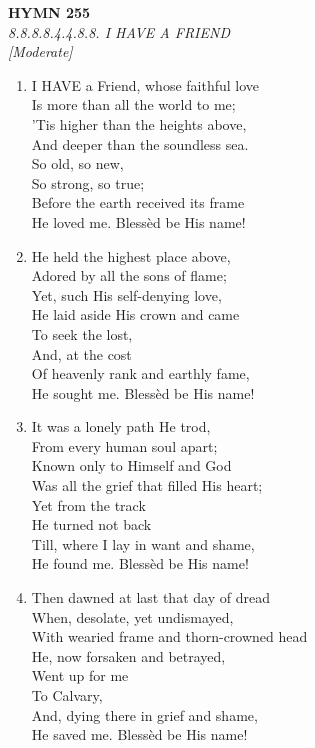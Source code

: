 \newpage
\begin{center}
    {\Large \textbf{HYMN 255}}
    \\
    \textit{8.8.8.8.4.4.8.8. I HAVE A FRIEND}
    \\
    \textit{\small [Moderate]}
\end{center}
\vspace{1em}

\begin{enumerate}
    \item I HAVE a Friend, whose faithful love \\
        Is more than all the world to me; \\
        'Tis higher than the heights above, \\
        And deeper than the soundless sea. \\
            So old, so new, \\
            So strong, so true; \\
        Before the earth received its frame \\
        He loved me. Bless\`ed be His name!

    \item He held the highest place above, \\
        Adored by all the sons of flame; \\
        Yet, such His self-denying love, \\
        He laid aside His crown and came \\
            To seek the lost, \\
            And, at the cost \\
        Of heavenly rank and earthly fame, \\
        He sought me. Bless\`ed be His name!

    \item It was a lonely path He trod, \\
        From every human soul apart; \\
        Known only to Himself and God \\
        Was all the grief that filled His heart; \\
            Yet from the track \\
            He turned not back \\
        Till, where I lay in want and shame, \\
        He found me. Bless\`ed be His name!

    \item Then dawned at last that day of dread \\
        When, desolate, yet undismayed, \\
        With wearied frame and thorn-crowned head \\
        He, now forsaken and betrayed, \\
            Went up for me \\
            To Calvary, \\
        And, dying there in grief and shame, \\
        He saved me. Bless\`ed be His name!


\end{enumerate}
